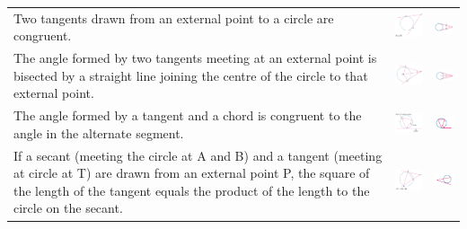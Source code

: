 \documentclass[a4paper,10pt]{report}
\begin{document}
\begin{center}
\begin{tabular}[center]{p{5cm}|p{3cm}|p{2cm}}
		Two tangents drawn from an external point to a circle are congruent.                                                                                                                                                         & \includegraphics[width=3cm]{circle theorem 9}  & \includegraphics[width=2cm]{circle theorem 9 symbol}  \\
		The angle formed by two tangents meeting at an external point is bisected by a straight line joining the centre of the circle to that external point.                                                                        & \includegraphics[width=3cm]{circle theorem 10} & \includegraphics[width=2cm]{circle theorem 10 symbol} \\
		The angle formed by a tangent and a chord is congruent to the angle in the alternate segment.                                                                                                                                & \includegraphics[width=3cm]{circle theorem 11} & \includegraphics[width=2cm]{circle theorem 11 symbol} \\
		If a secant (meeting the circle at A and B) and a tangent (meeting at circle at T) are drawn from an external point P, the square of the length of the tangent equals the product of the length to the circle on the secant. & \includegraphics[width=3cm]{circle theorem 12} & \includegraphics[width=2cm]{circle theorem 12 symbol} \\

\end{tabular}
\end{center}
\end{document}
